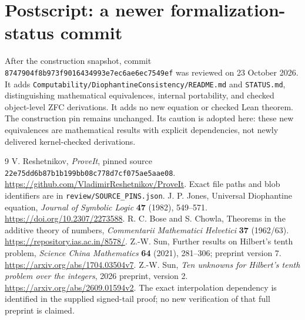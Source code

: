 \documentclass[11pt]{article}
\newcommand{\pin}{\texttt{22e75dd6b87b1b199bb08c778d7cf075ae5aae08}}
\begin{document}
\section*{Postscript: a newer formalization-status commit}
After the construction snapshot, commit
\texttt{8747904f8b973f9016434993e7ec6ae6ec7549ef} was reviewed on
23 October 2026. It adds \texttt{Computability/DiophantineConsistency/README.md}
and \texttt{STATUS.md}, distinguishing mathematical equivalences, internal
portability, and checked object-level ZFC derivations. It adds no new equation
or checked Lean theorem. The construction pin remains unchanged. Its caution
is adopted here: these new equivalences are mathematical results with explicit
dependencies, not newly delivered kernel-checked derivations.

\begin{thebibliography}{9}
 V. Reshetnikov, \emph{ProveIt}, pinned source \pin.
\url{https://github.com/VladimirReshetnikov/ProveIt}.
Exact file paths and blob identifiers are in \texttt{review/SOURCE\_PINS.json}.
 J. P. Jones, Universal Diophantine equation,
\emph{Journal of Symbolic Logic} \textbf{47} (1982), 549--571.
\url{https://doi.org/10.2307/2273588}.
 R. C. Bose and S. Chowla, Theorems in the additive theory of
numbers, \emph{Commentarii Mathematici Helvetici} \textbf{37} (1962/63).
\url{https://repository.ias.ac.in/8578/}.
 Z.-W. Sun, Further results on Hilbert's tenth problem,
\emph{Science China Mathematics} \textbf{64} (2021), 281--306;
preprint version 7. \url{https://arxiv.org/abs/1704.03504v7}.
 Z.-W. Sun, \emph{Ten unknowns for Hilbert's tenth problem over the integers},
2026 preprint, version 2. \url{https://arxiv.org/abs/2609.01594v2}.
The exact interpolation dependency is identified in the supplied signed-tail
proof; no new verification of that full preprint is claimed.
\end{thebibliography}
\end{document}

